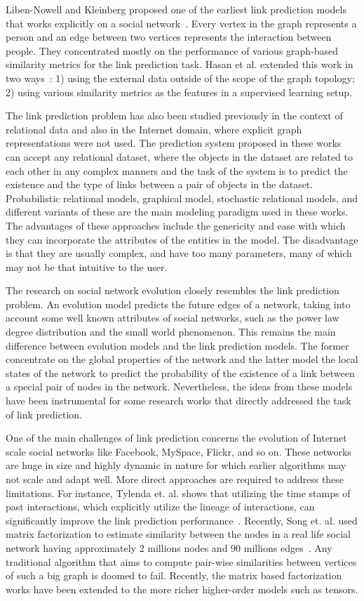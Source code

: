 Liben-Nowell and Kleinberg proposed one of the earliest link
prediction models that works explicitly on a social network~\cite{liben2003link}. Every
vertex in the graph represents a person and an edge between two
vertices represents the interaction between people. They
concentrated mostly on the performance of various graph-based
similarity metrics for the link prediction task. Hasan et al. extended
this work in two ways~\cite{al2005link}: 1) using the external data
outside of the scope of the graph topology; 2) using various
similarity metrics as the features in a supervised learning setup. 

The link prediction problem has also been studied previously in the context
of relational data and also in the Internet domain, where explicit graph representations were not used. The prediction system proposed in
these works can accept any relational dataset, where the objects in the dataset
are related to each other in any complex manners and the task of the system is
to predict the existence and the type of links between a pair of objects in the
dataset. Probabilistic relational models, graphical model, stochastic relational models, and different variants of these are the main
modeling paradigm used in these works. The advantages of these approaches
include the genericity and ease with which they can incorporate the attributes
of the entities in the model. The disadvantage is that they are usually complex, and
have too many parameters, many of which may not be that intuitive to the user.

The research on social network evolution closely resembles the
link prediction problem. An evolution model predicts the future edges of a network, taking into account some well known attributes of social networks, such
as the power law degree distribution and the small world phenomenon.
This remains the main difference between evolution models and the link prediction models. The former concentrate on the global properties of the network
and the latter model the local states of the network to predict the probability of
the existence of a link between a special pair of nodes in the network. Nevertheless, the ideas from these models have been instrumental for some research
works that directly addressed the task of link prediction.

One of the main challenges of link prediction concerns the evolution of Internet scale social networks like Facebook, MySpace, Flickr, and so on. These
networks are huge in size and highly dynamic in nature for which earlier algorithms may not scale and adapt well. More direct approaches are required to
address these limitations. For instance, Tylenda et. al. shows that utilizing
the time stamps of past interactions, which explicitly utilize the lineage of interactions, can significantly improve the link prediction performance~\cite{tylenda2009towards}. Recently,
Song et. al. used matrix factorization to estimate similarity between the
nodes in a real life social network having approximately 2 millions nodes and
90 millions edges~\cite{song2009scalable}. Any traditional algorithm that aims to compute pair-wise
similarities between vertices of such a big graph is doomed to fail. Recently,
the matrix based factorization works have been extended to the more richer
higher-order models such as tensors.
